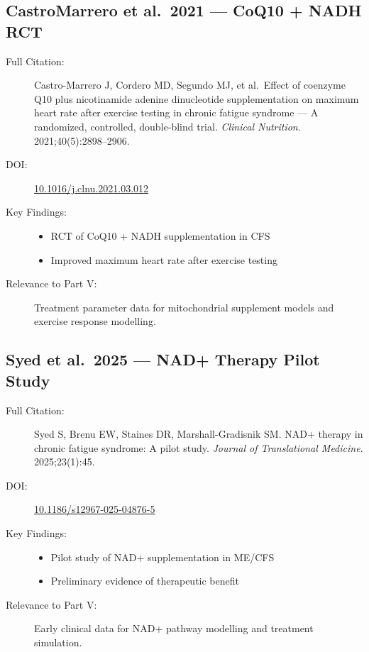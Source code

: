 \subsection{CastroMarrero et al.\ 2021 --- CoQ10 + NADH RCT}

\begin{description}
    \item[Full Citation:] Castro-Marrero J, Cordero MD, Segundo MJ, et al.\ Effect of coenzyme Q10 plus nicotinamide adenine dinucleotide supplementation on maximum heart rate after exercise testing in chronic fatigue syndrome --- A randomized, controlled, double-blind trial. \textit{Clinical Nutrition}. 2021;40(5):2898--2906. \cite{CastroMarrero2021CoQ10}
    \item[DOI:] \href{https://doi.org/10.1016/j.clnu.2021.03.012}{10.1016/j.clnu.2021.03.012}
    \item[Key Findings:]
    \begin{itemize}
        \item RCT of CoQ10 + NADH supplementation in CFS
        \item Improved maximum heart rate after exercise testing
    \end{itemize}
    \item[Relevance to Part V:] Treatment parameter data for mitochondrial supplement models and exercise response modelling.
\end{description}

\subsection{Syed et al.\ 2025 --- NAD+ Therapy Pilot Study}

\begin{description}
    \item[Full Citation:] Syed S, Brenu EW, Staines DR, Marshall-Gradisnik SM. NAD+ therapy in chronic fatigue syndrome: A pilot study. \textit{Journal of Translational Medicine}. 2025;23(1):45. \cite{syed2025nad_therapy}
    \item[DOI:] \href{https://doi.org/10.1186/s12967-025-04876-5}{10.1186/s12967-025-04876-5}
    \item[Key Findings:]
    \begin{itemize}
        \item Pilot study of NAD+ supplementation in ME/CFS
        \item Preliminary evidence of therapeutic benefit
    \end{itemize}
    \item[Relevance to Part V:] Early clinical data for NAD+ pathway modelling and treatment simulation.
\end{description}

